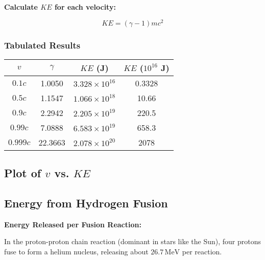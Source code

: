 \documentclass{article}
\begin{document}
\begin{multicols}{2}
\textbf{Calculate \( KE \) for each velocity:}

\[
KE = (\gamma - 1) m c^2
\]

\subsubsection*{Tabulated Results}

\begin{center}
\begin{tabular}{@{}cccc@{}}
\toprule
\( v \) & \( \gamma \) & \( KE \) (J) & \( KE \) (\( 10^{16} \) J) \\
\midrule
\( 0.1c \) & 1.0050 & \( 3.328 \times 10^{16} \) & 0.3328 \\
\( 0.5c \) & 1.1547 & \( 1.066 \times 10^{18} \) & 10.66 \\
\( 0.9c \) & 2.2942 & \( 2.205 \times 10^{19} \) & 220.5 \\
\( 0.99c \) & 7.0888 & \( 6.583 \times 10^{19} \) & 658.3 \\
\( 0.999c \) & 22.3663 & \( 2.078 \times 10^{20} \) & 2078 \\
\bottomrule
\end{tabular}
\end{center}

\subsection*{Plot of \( v \) vs. \( KE \)}


\subsection*{Energy from Hydrogen Fusion}

\textbf{Energy Released per Fusion Reaction:}

In the proton-proton chain reaction (dominant in stars like the Sun), four protons fuse to form a helium nucleus, releasing about \( 26.7\, \text{MeV} \) per reaction.


\end{multicols}
\end{document}
